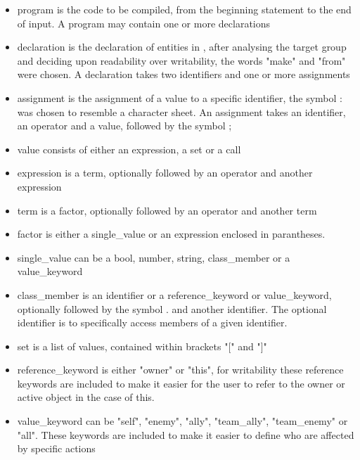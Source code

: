 \pagebreak
\begin{itemize}
\item program is the code to be compiled, from the beginning statement to the end of input.
A program may contain one or more declarations

\item declaration is the declaration of entities in \langname{}, after analysing the target group
and deciding upon readability over writability, the words "make" and "from" were chosen.
A declaration takes two identifiers and one or more assignments

\item assignment is the assignment of a value to a specific identifier, the symbol : was chosen
to resemble a character sheet.
An assignment takes an identifier, an operator and a value, followed by the symbol ;

\item value consists of either an expression, a set or a call

\item expression is a term, optionally followed by an operator and another expression

\item term is a factor, optionally followed by an operator and another term

\item factor is either a single\_value or an expression enclosed in parantheses. 

\item single\_value can be a bool, number, string, class\_member or a value\_keyword

\item class\_member is an identifier or a reference\_keyword or value\_keyword, optionally followed
by the symbol . and another identifier. The optional identifier is to specifically access members
of a given identifier.

\item set is a list of values, contained within brackets "[" and "]"

\item reference\_keyword is either "owner" or "this", for writability these reference keywords are included
to make it easier for the user to refer to the owner or active object in the case of this.

\item value\_keyword can be "self", "enemy", "ally", "team\_ally", "team\_enemy" or "all".
These keywords are included to make it easier to define who are affected by specific actions


\end{itemize}
